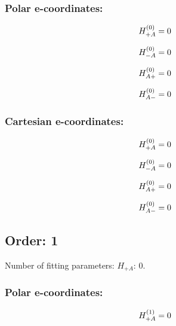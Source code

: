 \documentclass[fleqn]{article}
\begin{document}
\subsubsection*{Polar e-coordinates:}

\begin{dmath*}
H_{+A}^{(0)}=0\\
\end{dmath*}

\begin{dmath*}
H_{-A}^{(0)}=0\\
\end{dmath*}

\begin{dmath*}
H_{A+}^{(0)}=0\\
\end{dmath*}

\begin{dmath*}
H_{A-}^{(0)}=0\\
\end{dmath*}
\subsubsection*{Cartesian e-coordinates:}

\begin{dmath*}
H_{+A}^{(0)}=0\\
\end{dmath*}

\begin{dmath*}
H_{-A}^{(0)}=0\\
\end{dmath*}

\begin{dmath*}
H_{A+}^{(0)}=0\\
\end{dmath*}

\begin{dmath*}
H_{A-}^{(0)}=0\\
\end{dmath*}
\subsection{Order: 1}
Number of fitting parameters: $H_{+A}$: $0$.
\subsubsection*{Polar e-coordinates:}

\begin{dmath*}
H_{+A}^{(1)}=0\\
\end{dmath*}
\end{document}
